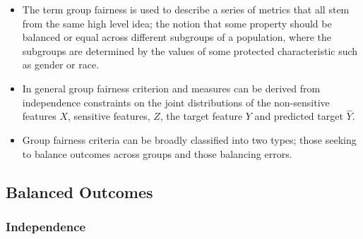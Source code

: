\begin{itemize}[leftmargin=*]
\item The term group fairness is used to describe a series of metrics that all stem from the same high level idea; the notion that some property should be balanced or equal across different subgroups of a population, where the subgroups are determined by the values of some protected characteristic such as gender or race.
%
\item In general group fairness criterion and measures can be derived from independence constraints on the joint distributions of the non-sensitive features $X$, sensitive features, $Z$, the target feature $Y$ and predicted target $\hat{Y}$.
%
\item Group fairness criteria can be broadly classified into two types; those seeking to balance outcomes across groups and those balancing errors.
%
\end{itemize}

\subsection*{Balanced Outcomes}

\subsubsection*{Independence}

